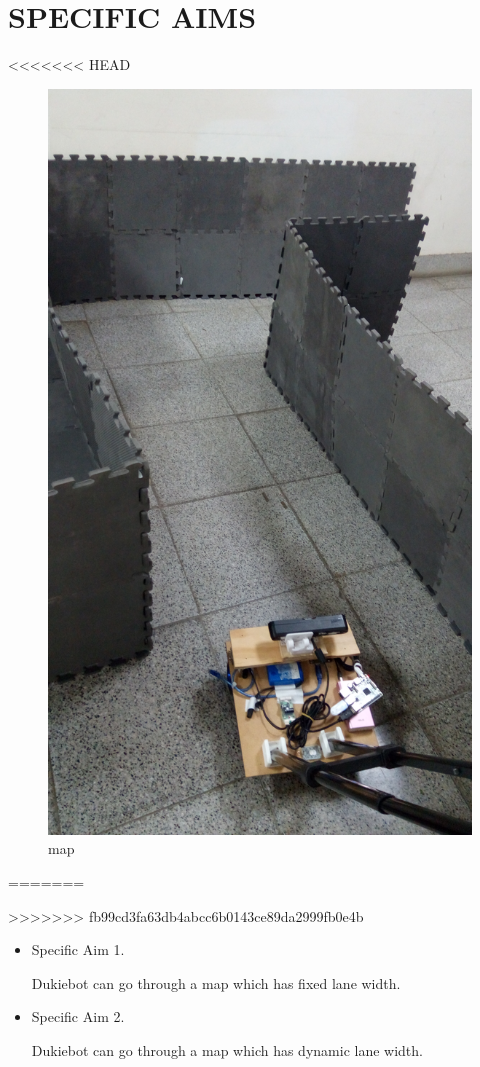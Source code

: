 \documentclass[letterpaper, 10 pt, conference]{ieeeconf}  %
\begin{document}
\section{SPECIFIC AIMS}

<<<<<<< HEAD
\begin{figure}[h] %
\includegraphics[width=0.8\columnwidth]{map.jpg}
\centering
\caption{map}
\end{figure}
=======

>>>>>>> fb99cd3fa63db4abcc6b0143ce89da2999fb0e4b
\begin{itemize}
The experiment environment is a map in shape of a lightning bolt, the duckiebot needs to turn left and right in order to get to the end. 
\item Specific Aim 1.

Dukiebot can go through a map which has fixed lane width.
\item Specific Aim 2.

Dukiebot can go through a map which has dynamic lane width.
\end{itemize}
\end{document}
